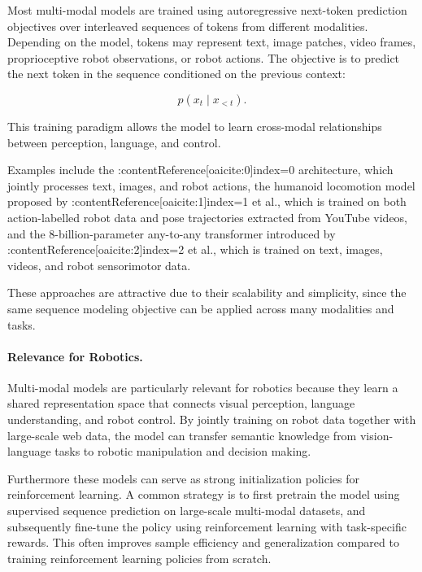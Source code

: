 Most multi-modal models are trained using autoregressive next-token prediction objectives over interleaved sequences of tokens from different modalities. 
Depending on the model, tokens may represent text, image patches, video frames, proprioceptive robot observations, or robot actions. 
The objective is to predict the next token in the sequence conditioned on the previous context:

\begin{equation}
p(x_t \mid x_{<t}).
\end{equation}

This training paradigm allows the model to learn cross-modal relationships between perception, language, and control.

Examples include the :contentReference[oaicite:0]{index=0} architecture, which jointly processes text, images, and robot actions, the humanoid locomotion model proposed by :contentReference[oaicite:1]{index=1} et al., which is trained on both action-labelled robot data and pose trajectories extracted from YouTube videos, and the 8-billion-parameter any-to-any transformer introduced by :contentReference[oaicite:2]{index=2} et al., which is trained on text, images, videos, and robot sensorimotor data.

These approaches are attractive due to their scalability and simplicity, since the same sequence modeling objective can be applied across many modalities and tasks.

\paragraph{Relevance for Robotics.}

Multi-modal models are particularly relevant for robotics because they learn a shared representation space that connects visual perception, language understanding, and robot control. 
By jointly training on robot data together with large-scale web data, the model can transfer semantic knowledge from vision-language tasks to robotic manipulation and decision making.

Furthermore these models can serve as strong initialization policies for reinforcement learning. 
A common strategy is to first pretrain the model using supervised sequence prediction on large-scale multi-modal datasets, and subsequently fine-tune the policy using reinforcement learning with task-specific rewards. 
This often improves sample efficiency and generalization compared to training reinforcement learning policies from scratch.

